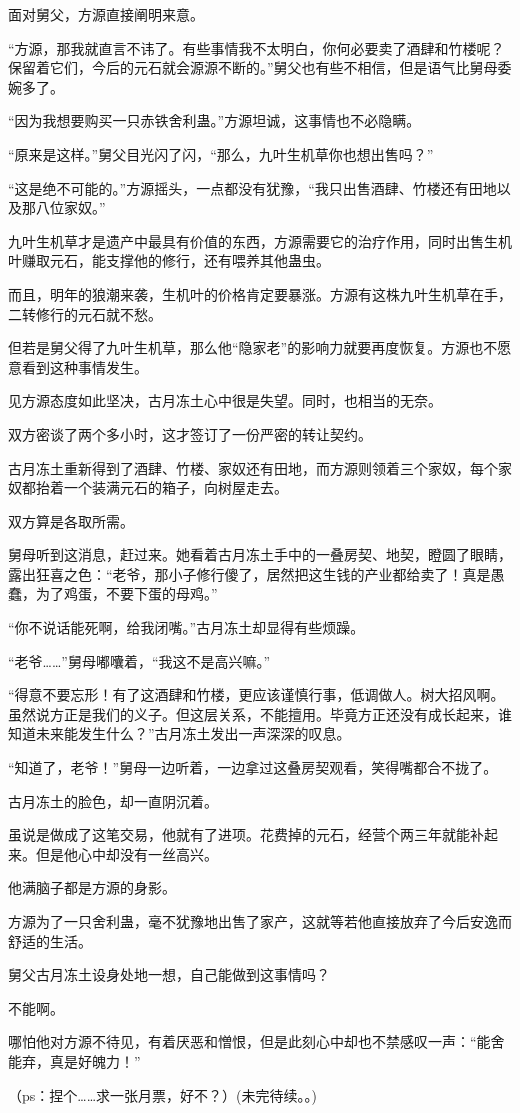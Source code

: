 \begin{this_body}
面对舅父，方源直接阐明来意。

“方源，那我就直言不讳了。有些事情我不太明白，你何必要卖了酒肆和竹楼呢？保留着它们，今后的元石就会源源不断的。”舅父也有些不相信，但是语气比舅母委婉多了。

“因为我想要购买一只赤铁舍利蛊。”方源坦诚，这事情也不必隐瞒。

“原来是这样。”舅父目光闪了闪，“那么，九叶生机草你也想出售吗？”

“这是绝不可能的。”方源摇头，一点都没有犹豫，“我只出售酒肆、竹楼还有田地以及那八位家奴。”

九叶生机草才是遗产中最具有价值的东西，方源需要它的治疗作用，同时出售生机叶赚取元石，能支撑他的修行，还有喂养其他蛊虫。

而且，明年的狼潮来袭，生机叶的价格肯定要暴涨。方源有这株九叶生机草在手，二转修行的元石就不愁。

但若是舅父得了九叶生机草，那么他“隐家老”的影响力就要再度恢复。方源也不愿意看到这种事情发生。

见方源态度如此坚决，古月冻土心中很是失望。同时，也相当的无奈。

双方密谈了两个多小时，这才签订了一份严密的转让契约。

古月冻土重新得到了酒肆、竹楼、家奴还有田地，而方源则领着三个家奴，每个家奴都抬着一个装满元石的箱子，向树屋走去。

双方算是各取所需。

舅母听到这消息，赶过来。她看着古月冻土手中的一叠房契、地契，瞪圆了眼睛，露出狂喜之色：“老爷，那小子修行傻了，居然把这生钱的产业都给卖了！真是愚蠢，为了鸡蛋，不要下蛋的母鸡。”

“你不说话能死啊，给我闭嘴。”古月冻土却显得有些烦躁。

“老爷……”舅母嘟囔着，“我这不是高兴嘛。”

“得意不要忘形！有了这酒肆和竹楼，更应该谨慎行事，低调做人。树大招风啊。虽然说方正是我们的义子。但这层关系，不能擅用。毕竟方正还没有成长起来，谁知道未来能发生什么？”古月冻土发出一声深深的叹息。

“知道了，老爷！”舅母一边听着，一边拿过这叠房契观看，笑得嘴都合不拢了。

古月冻土的脸色，却一直阴沉着。

虽说是做成了这笔交易，他就有了进项。花费掉的元石，经营个两三年就能补起来。但是他心中却没有一丝高兴。

他满脑子都是方源的身影。

方源为了一只舍利蛊，毫不犹豫地出售了家产，这就等若他直接放弃了今后安逸而舒适的生活。

舅父古月冻土设身处地一想，自己能做到这事情吗？

不能啊。

哪怕他对方源不待见，有着厌恶和憎恨，但是此刻心中却也不禁感叹一声：“能舍能弃，真是好魄力！”

（ps：捏个……求一张月票，好不？）(未完待续。。)

\end{this_body}

